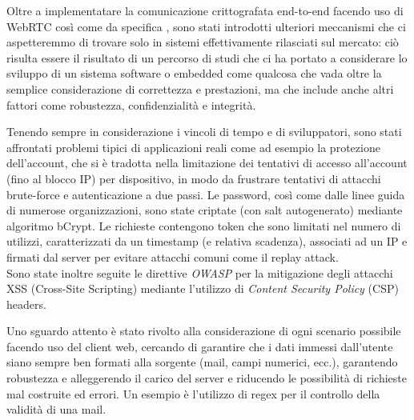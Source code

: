 Oltre a implementatare la comunicazione crittografata end-to-end facendo uso di WebRTC così come da specifica , sono stati introdotti ulteriori meccanismi che ci aspetteremmo di trovare solo in sistemi effettivamente rilasciati sul mercato: ciò risulta essere il risultato di un percorso di studi che ci ha portato a considerare lo sviluppo di un sistema software o embedded come qualcosa che vada oltre la semplice considerazione di correttezza e prestazioni, ma che include anche altri fattori come robustezza, confidenzialità e integrità.

Tenendo sempre in considerazione i vincoli di tempo e di sviluppatori, sono stati affrontati problemi tipici di applicazioni reali come ad esempio la protezione dell'account, che si è tradotta nella limitazione dei tentativi di accesso all'account (fino al blocco IP) per dispositivo, in modo da frustrare tentativi di attacchi brute-force e autenticazione a due passi. Le password, così come dalle linee guida di numerose organizzazioni, sono state criptate (con salt autogenerato) mediante algoritmo bCrypt. Le richieste contengono token che sono limitati nel numero di utilizzi, caratterizzati da un timestamp (e relativa scadenza), associati ad un IP e firmati dal server per evitare attacchi comuni come il replay attack.\\
Sono state inoltre seguite le direttive \textit{OWASP} per la mitigazione degli attacchi XSS (Cross-Site Scripting) mediante l'utilizzo di \textit{Content Security Policy} (CSP) headers.

Uno sguardo attento è stato rivolto alla considerazione di ogni scenario possibile facendo uso del client web, cercando di garantire che i dati immessi dall'utente siano sempre ben formati alla sorgente (mail, campi numerici, ecc.), garantendo robustezza e alleggerendo il carico del server e riducendo le possibilità di richieste mal costruite ed errori. Un esempio è l'utilizzo di regex per il controllo della validità di una mail.

\newpage